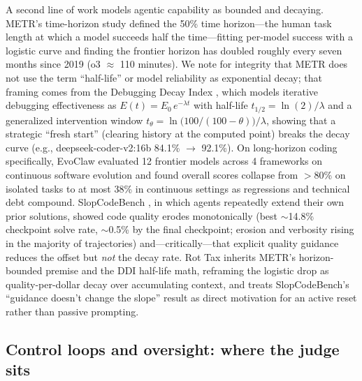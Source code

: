 \documentclass[11pt]{article}
\begin{document}
A second line of work models agentic capability as bounded and decaying.
METR's time-horizon study \cite{kwa2025metr} defined the 50\% time
horizon---the human task length at which a model succeeds half the
time---fitting per-model success with a logistic curve and finding the
frontier horizon has doubled roughly every seven months since 2019
(o3 $\approx$ 110 minutes). We note for integrity that METR does not use the
term ``half-life'' or model reliability as exponential decay; that framing
comes from the Debugging Decay Index \cite{adnan2025ddi}, which models
iterative debugging effectiveness as $E(t) = E_0\,e^{-\lambda t}$ with
half-life $t_{1/2} = \ln(2)/\lambda$ and a generalized intervention window
$t_\theta = \ln\!\big(100/(100-\theta)\big)/\lambda$, showing that a strategic
``fresh start'' (clearing history at the computed point) breaks the decay
curve (e.g., deepseek-coder-v2:16b 84.1\% $\to$ 92.1\%). On long-horizon
coding specifically, EvoClaw \cite{deng2026evoclaw} evaluated 12 frontier
models across 4 frameworks on continuous software evolution and found overall
scores collapse from $>$80\% on isolated tasks to at most 38\% in continuous
settings as regressions and technical debt compound. SlopCodeBench
\cite{orlanski2026slopcodebench}, in which agents repeatedly extend their own
prior solutions, showed code quality erodes monotonically (best $\sim$14.8\%
checkpoint solve rate, $\sim$0.5\% by the final checkpoint; erosion and
verbosity rising in the majority of trajectories) and---critically---that
explicit quality guidance reduces the offset but \emph{not} the decay rate.
Rot Tax inherits METR's horizon-bounded premise and the DDI half-life math,
reframing the logistic drop as quality-per-dollar decay over accumulating
context, and treats SlopCodeBench's ``guidance doesn't change the slope''
result as direct motivation for an active reset rather than passive prompting.

\subsection{Control loops and oversight: where the judge sits}
\label{sec:rw-control}
\end{document}
